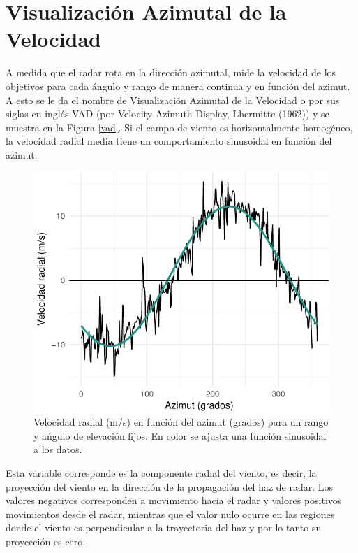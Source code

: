 \documentclass[12pt,spanish,oneside, a4paper]{book}
\begin{document}
\section{\texorpdfstring{Visualización Azimutal de la Velocidad
\label{sec-vad}}{Visualización Azimutal de la Velocidad }}\label{visualizacion-azimutal-de-la-velocidad}

A medida que el radar rota en la dirección azimutal, mide la velocidad
de los objetivos para cada ángulo y rango de manera continua y en
función del azimut. A esto se le da el nombre de Visualización Azimutal
de la Velocidad o por sus siglas en inglés VAD (por Velocity Azimuth
Display, Lhermitte (1962)) y se muestra en la Figura \ref{vad}. Si el
campo de viento es horizontalmente homogéneo, la velocidad radial media
tiene un comportamiento sinusoidal en función del azimut.

\begin{figure}

{\centering \includegraphics{Tesis_files/figure-latex/vad-1} 

}

\caption{Velocidad radial (m/s) en función del azimut (grados) para un rango y ańgulo de elevación fijos. En color se  ajusta una función sinusoidal a los datos. \label{vad}}\label{fig:vad}
\end{figure}

Esta variable corresponde es la componente radial del viento, es decir,
la proyección del viento en la dirección de la propagación del haz de
radar. Los valores negativos corresponden a movimiento hacia el radar y
valores positivos movimientos desde el radar, mientras que el valor nulo
ocurre en las regiones donde el viento es perpendicular a la trayectoria
del haz y por lo tanto su proyección es cero.
\end{document}
